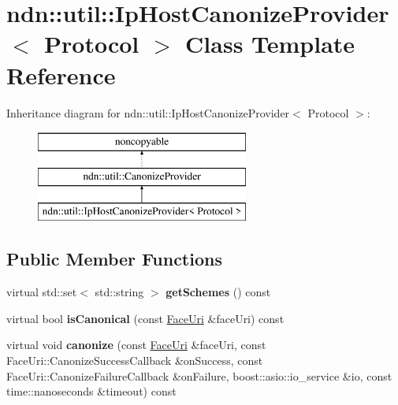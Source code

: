 \hypertarget{classndn_1_1util_1_1IpHostCanonizeProvider}{}\section{ndn\+:\+:util\+:\+:Ip\+Host\+Canonize\+Provider$<$ Protocol $>$ Class Template Reference}
\label{classndn_1_1util_1_1IpHostCanonizeProvider}
Inheritance diagram for ndn\+:\+:util\+:\+:Ip\+Host\+Canonize\+Provider$<$ Protocol $>$\+:\begin{figure}[H]
\begin{center}
\leavevmode
\includegraphics[height=3.000000cm]{classndn_1_1util_1_1IpHostCanonizeProvider}
\end{center}
\end{figure}
\subsection*{Public Member Functions}
\begin{DoxyCompactItemize}
\item 
virtual std\+::set$<$ std\+::string $>$ {\bfseries get\+Schemes} () const\hypertarget{classndn_1_1util_1_1IpHostCanonizeProvider_a4484ae4771deffc70210bd0652fe6077}{}\label{classndn_1_1util_1_1IpHostCanonizeProvider_a4484ae4771deffc70210bd0652fe6077}

\item 
virtual bool {\bfseries is\+Canonical} (const \hyperlink{classndn_1_1util_1_1FaceUri}{Face\+Uri} \&face\+Uri) const\hypertarget{classndn_1_1util_1_1IpHostCanonizeProvider_a4dcd690990dc04523518a39ca9639432}{}\label{classndn_1_1util_1_1IpHostCanonizeProvider_a4dcd690990dc04523518a39ca9639432}

\item 
virtual void {\bfseries canonize} (const \hyperlink{classndn_1_1util_1_1FaceUri}{Face\+Uri} \&face\+Uri, const Face\+Uri\+::\+Canonize\+Success\+Callback \&on\+Success, const Face\+Uri\+::\+Canonize\+Failure\+Callback \&on\+Failure, boost\+::asio\+::io\+\_\+service \&io, const time\+::nanoseconds \&timeout) const\hypertarget{classndn_1_1util_1_1IpHostCanonizeProvider_afc2073af7b01ffba1454544cfa4dfbb5}{}\label{classndn_1_1util_1_1IpHostCanonizeProvider_afc2073af7b01ffba1454544cfa4dfbb5}

\end{DoxyCompactItemize}
